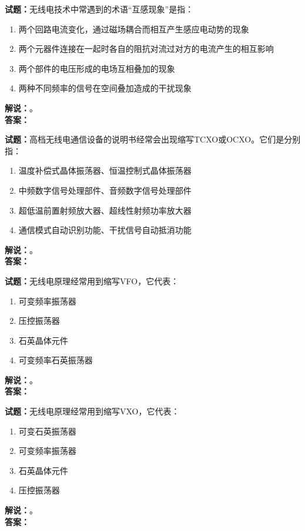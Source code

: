 \documentclass{ctexbook}
\begin{document}
\bigskip

\noindent\textbf{试题：}无线电技术中常遇到的术语“互感现象”是指：
\begin{enumerate}[leftmargin=3em]
  \item 两个回路电流变化，通过磁场耦合而相互产生感应电动势的现象
  \item 两个元器件连接在一起时各自的阻抗对流过对方的电流产生的相互影响
  \item 两个部件的电压形成的电场互相叠加的现象
  \item 两种不同频率的信号在空间叠加造成的干扰现象
\end{enumerate}
\noindent\textbf{解说：}\textbf{}。\\\noindent\textbf{答案：}

\bigskip

\noindent\textbf{试题：}高档无线电通信设备的说明书经常会出现缩写TCXO或OCXO。它们是分别指：
\begin{enumerate}[leftmargin=3em]
  \item 温度补偿式晶体振荡器、恒温控制式晶体振荡器
  \item 中频数字信号处理部件、音频数字信号处理部件
  \item 超低温前置射频放大器、超线性射频功率放大器
  \item 通信模式自动识别功能、干扰信号自动抵消功能
\end{enumerate}
\noindent\textbf{解说：}\textbf{}。\\\noindent\textbf{答案：}

\bigskip

\noindent\textbf{试题：}无线电原理经常用到缩写VFO，它代表：
\begin{enumerate}[leftmargin=3em]
  \item 可变频率振荡器
  \item 压控振荡器
  \item 石英晶体元件
  \item 可变频率石英振荡器
\end{enumerate}
\noindent\textbf{解说：}\textbf{}。\\\noindent\textbf{答案：}

\bigskip

\noindent\textbf{试题：}无线电原理经常用到缩写VXO，它代表：
\begin{enumerate}[leftmargin=3em]
  \item 可变石英振荡器
  \item 可变频率振荡器
  \item 石英晶体元件
  \item 压控振荡器
\end{enumerate}
\noindent\textbf{解说：}\textbf{}。\\\noindent\textbf{答案：}
\end{document}
